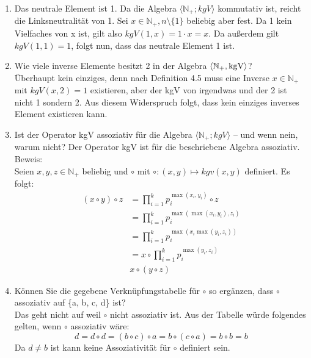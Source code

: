 \begin{enumerate}[label=(\alph*)]
        \item 
        Das neutrale Element ist 1.
        Da die Algebra $\langle\mathbb{N}_+; kgV \rangle$ kommutativ ist, reicht die Linksneutralität von 1. Sei $x \in \mathbb{ N}_+, n \setminus \{1\}$ beliebig aber fest.  Da 1 kein Vielfaches von x ist, gilt also $kgV (1, x) = 1 \cdot x =  x$. Da außerdem gilt $kgV (1, 1) = 1$, folgt nun, dass das neutrale Element 1 ist.
        
        \item Wie viele inverse Elemente besitzt 2 in der Algebra $\langle \mathbb{N}_+ , \operatorname{kgV} \rangle$?\\
        Überhaupt kein einziges, denn nach Definition 4.5 muss eine Inverse $x \in \mathbb{N}_+ $ mit $kgV(x,2) = 1$ existieren, aber der kgV von irgendwas und der 2 ist nicht 1 sondern 2. Aus diesem Widerspruch folgt, dass kein einziges inverses Element existieren kann.
        
        \item 
         Ist der Operator kgV assoziativ für die Algebra $\langle \mathbb{N}_+; kgV \rangle$ – und wenn nein, warum
         nicht?
         Der Operator kgV ist für die beschriebene Algebra assoziativ.\\
         Beweis: \\
         Seien $x, y, z \in \mathbb{N}_{+}$ beliebig und $\circ$ mit $\circ : (x,y) \mapsto kgv(x,y)$ definiert. Es folgt:\\
         \begin{align*} 
         	(x \circ y) \circ z &= \prod_{i=1}^{k} p_i^{\max(x_i,y_i)} \circ z \\
         	&=\prod_{i=1}^{k} p_i^{\max(\max(x_i,y_i),z_i)} \\
         	&=\prod_{i=1}^{k} p_i^{\max(x_i \max(y_i,z_i))} \\
         	&=x \circ \prod_{i=1}^{k} p_i^{\max(y_i,z_i)} \\
         	& x \circ (y \circ z)  
         \end{align*} 
         
        \item Können Sie die gegebene Verknüpfungstabelle für $\circ$ so ergänzen, dass $\circ$ assoziativ 
        auf \{a, b, c, d\} ist?\\
        Das geht nicht auf weil $\circ$ nicht assoziativ ist. Aus der Tabelle würde folgendes gelten, wenn $\circ$ assoziativ wäre: $$d = d \circ d = (b \circ c) \circ a = b \circ (c \circ a) = b \circ b = b$$
        Da $d \neq b$ ist kann keine Assoziativität für $\circ$ definiert sein.
       

\end{enumerate}
